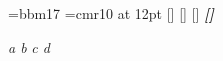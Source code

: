 \documentclass{article}
\begin{document}
\font\x=bbm17 \font\y=cmr10 at 12pt
[\the{}\x] [\the{}\y] \textsc{[\the{}\font]} \textbf{\textit{[\the{}\font]}}
{\fontsize{11}{13}}

{\itshape a {\em b}} {\slshape c {\em d}}
\end{document}
